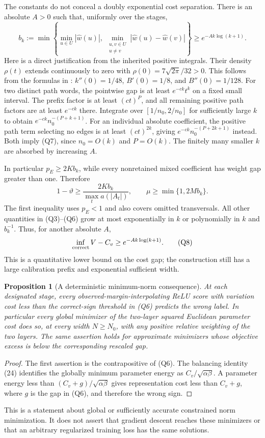 \documentclass[11pt]{article}
\newtheorem{proposition}[theorem]{Proposition}
\begin{document}
The constants do not conceal a doubly exponential cost separation.
There is an absolute $A>0$ such that, uniformly over the stages,
\[
 b_k:=\min\left\{\min_{u\in U}|\widehat w(u)|,\
                 \min_{\substack{u,v\in U\\u\ne v}}
                     |\widehat w(u)-\widehat w(v)|\right\}
                       \ge e^{-A k\log(k+1)}.           \tag{Q7}
\]
Here is a direct justification from the inherited positive integrals.
Their density $\rho(t)$ extends continuously to zero with
$\rho(0)=7\sqrt{2\pi}/32>0$. This follows from the formulas in
\cite{shared}: $k''(0)=1/48$, $B'(0)=1/8$, and $B''(0)=1/128$.
For two distinct path words, the pointwise gap is at least
$e^{-c k}t^k$ on a fixed small interval. The prefix factor is at least
$(ct)^P$, and all remaining positive path factors are at least
$e^{-ck}$ there. Integrate over $[1/n_0,2/n_0]$ for sufficiently
large $k$ to obtain
$e^{-ck}n_0^{-(P+k+1)}$. For an individual absolute coefficient,
the positive path term selecting no edges is at least
$(ct)^{2k}$, giving
$e^{-ck}n_0^{-(P+2k+1)}$ instead.
Both imply (Q7), since $n_0=O(k)$ and $P=O(k)$.
The finitely many smaller $k$ are absorbed by increasing $A$.

In particular $p_E\ge2Kb_k$, while every nonretained mixed coefficient
has weight gap greater than one. Therefore
\[
 1-\vartheta\ge\frac{2Kb_k}{\max_t a(|A_t|)},\qquad
 \mu\ge\min\{1,2Mb_k\}.
\]
The first inequality uses $p_E<1$ and also covers omitted transversals.
All other quantities in (Q3)--(Q6) grow at most exponentially in $k$
or polynomially in $k$ and $b_k^{-1}$. Thus, for another absolute $A$,
\[
             \inf_{\rm correct}V-C_v\ge e^{-A k\log(k+1)}. \tag{Q8}
\]
This is a quantitative lower bound on the cost gap; the construction
still has a large calibration prefix and exponential sufficient width.

\begin{proposition}[A deterministic minimum-norm consequence]
At each designated stage, every observed-margin-interpolating ReLU
score with variation cost less than the correct-sign threshold in
(Q6) predicts the wrong label. In particular every global minimizer
of the two-layer squared Euclidean parameter cost does so, at every
width $N\ge N_0$, with any positive relative weighting of the two
layers. The same assertion holds for approximate minimizers whose
objective excess is below the corresponding rescaled gap.
\end{proposition}
\begin{proof}
The first assertion is the contrapositive of (Q6). The balancing
identity (24) identifies the globally minimum parameter energy as
$C_v/\sqrt{\alpha\beta}$. A parameter energy less than
$(C_v+g)/\sqrt{\alpha\beta}$ gives representation cost less than
$C_v+g$, where $g$ is the gap in (Q6), and therefore the wrong sign.
\end{proof}
This is a statement about global or sufficiently accurate constrained
norm minimization. It does not assert that gradient descent reaches
these minimizers or that an arbitrary regularized training loss has
the same solutions.
\end{document}
